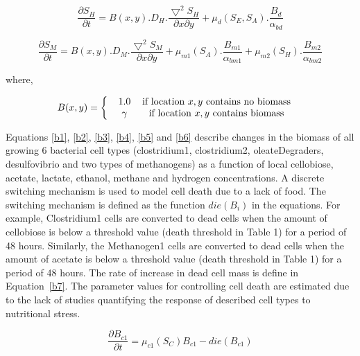 \begin{equation}
\frac{\partial S_{H}}{\partial t} = B(x,y).D_{H}.\frac{\bigtriangledown^{2} S_{H}}{{\partial x}{\partial y}}+ \mu_{d}(S_{E},S_{A}).\frac{B_{d}}{\alpha_{bd}}
\label{s6}
\end{equation}

\begin{equation}
\frac{\partial S_{M}}{\partial t} = B(x,y).D_{M}.\frac{\bigtriangledown^{2} S_{M}}{{\partial x}{\partial y}}+ \mu_{m1}(S_{A}).\frac{B_{m1}}{\alpha_{bm1}}+ \mu_{m2}(S_{H}).\frac{B_{m2}}{\alpha_{bm2}}
\label{s7}
\end{equation}

where,

\begin{equation}
B(x,y)=\left\{
\begin{array}{ll}
\begin{tabular}{cc}

1.0    & if location $x,y$ contains no biomass\\

$\gamma$ & if location $x,y$ contains biomass
\end{tabular}

\end{array}
\right.
\label{s8}
\end{equation}

Equations \ref{b1}, \ref{b2}, \ref{b3}, \ref{b4}, \ref{b5} and \ref{b6}  describe changes in the biomass of all growing 6 bacterial cell types (clostridium1, clostridium2, oleateDegraders, desulfovibrio and two types of methanogens) as a function of local cellobiose, acetate, lactate, ethanol, methane and hydrogen concentrations. A discrete switching mechanism is used to model cell death due to a lack of food. The switching mechanism is defined as the function $die(B_i)$ in the equations. For example, Clostridium1 cells are converted to dead cells when the amount of cellobiose is below a threshold value (death threshold in Table 1) for a period of 48 hours. Similarly,  the Methanogen1 cells are converted to dead cells when the amount of acetate is below a threshold value (death threshold in Table 1) for a period of 48 hours. The rate of increase in dead cell mass is define in Equation~\ref{b7}. The parameter values for controlling cell death are estimated due to the lack of studies quantifying the response of described cell types to nutritional stress.

\begin{equation}
\frac{\partial B_{c1}}{\partial t} = \mu_{c1}(S_{C}) B_{c1}-die(B_{c1})
\label{b1}
\end{equation}


